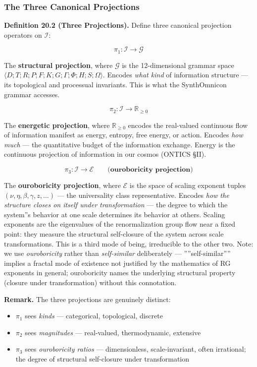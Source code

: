 \documentclass[12pt,a4paper]{article}
\newcommand{\pilcrow}{\S}
\begin{document}
\subsubsection{The Three Canonical Projections}

\textbf{Definition 20.2 (Three Projections).} Define three canonical projection operators on $\mathcal{I}$:

\[\pi_1 : \mathcal{I} \to \mathcal{G}\]

The \textbf{structural projection}, where $\mathcal{G}$ is the 12-dimensional grammar space $\langle D; T; R; P; F; K; G; \Gamma; \Phi; H; S; \Omega \rangle$. Encodes \emph{what kind} of information structure --- its topological and processual invariants. This is what the SynthOmnicon grammar accesses.

\[\pi_2 : \mathcal{I} \to \mathbb{R}_{\geq 0}\]

The \textbf{energetic projection}, where $\mathbb{R}_{\geq 0}$ encodes the real-valued continuous flow of information manifest as energy, entropy, free energy, or action. Encodes \emph{how much} --- the quantitative budget of the information exchange. Energy is the continuous projection of information in our cosmos (ONTICS \pilcrow{}II).

\[\pi_3 : \mathcal{I} \to \mathcal{E} \qquad \textbf{(ouroboricity projection)}\]

The \textbf{ouroboricity projection}, where $\mathcal{E}$ is the space of scaling exponent tuples $(\nu, \eta, \beta, \gamma, z, \ldots)$ --- the universality class representative. Encodes \emph{how the structure closes on itself under transformation} --- the degree to which the system''s behavior at one scale determines its behavior at others. Scaling exponents are the eigenvalues of the renormalization group flow near a fixed point: they measure the structural self-closure of the system across scale transformations. This is a third mode of being, irreducible to the other two. Note: we use \emph{ouroboricity} rather than \emph{self-similar} deliberately --- ''''self-similar'''' implies a fractal mode of existence not justified by the mathematics of RG exponents in general; ouroboricity names the underlying structural property (closure under transformation) without this connotation.

\textbf{Remark.} The three projections are genuinely distinct:

\begin{itemize}
    \item $\pi_1$ sees \emph{kinds} --- categorical, topological, discrete
    \item $\pi_2$ sees \emph{magnitudes} --- real-valued, thermodynamic, extensive
    \item $\pi_3$ sees \emph{ouroboricity ratios} --- dimensionless, scale-invariant, often irrational; the degree of structural self-closure under transformation
\end{itemize}
\end{document}
